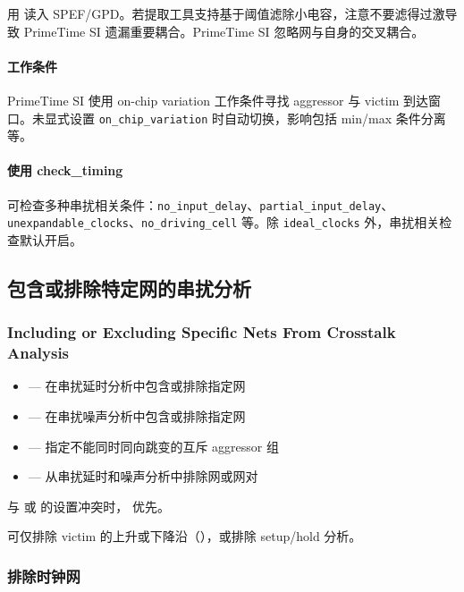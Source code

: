 用  读入 SPEF/GPD。若提取工具支持基于阈值滤除小电容，注意不要滤得过激导致 PrimeTime SI 遗漏重要耦合。PrimeTime SI 忽略网与自身的交叉耦合。

\paragraph*{工作条件}

PrimeTime SI 使用 on-chip variation 工作条件寻找 aggressor 与 victim 到达窗口。未显式设置 \texttt{on\_chip\_variation} 时自动切换，影响包括 min/max 条件分离等。

\paragraph*{使用 check\_timing}

 可检查多种串扰相关条件：\texttt{no\_input\_delay}、\texttt{partial\_input\_delay}、\texttt{unexpandable\_clocks}、\texttt{no\_driving\_cell} 等。除 \texttt{ideal\_clocks} 外，串扰相关检查默认开启。

\subsection{包含或排除特定网的串扰分析}
\subsubsection*{Including or Excluding Specific Nets From Crosstalk Analysis}

\begin{itemize}
  \item {} — 在串扰延时分析中包含或排除指定网
  \item {} — 在串扰噪声分析中包含或排除指定网
  \item {} — 指定不能同时同向跳变的互斥 aggressor 组
  \item {} — 从串扰延时和噪声分析中排除网或网对
\end{itemize}

 与  或  的设置冲突时， 优先。

可仅排除 victim 的上升或下降沿（），或排除 setup/hold 分析。

\subsubsection{排除时钟网}
